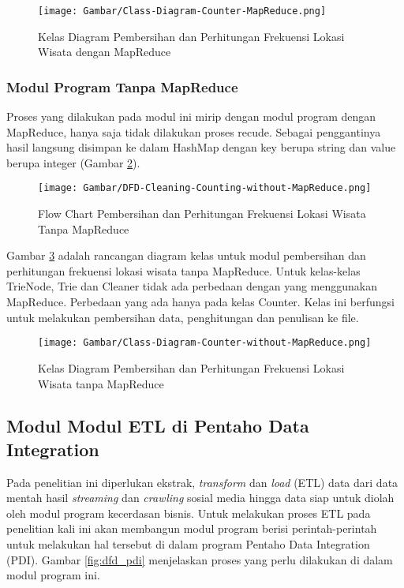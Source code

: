 \begin{figure}[H]
	\centering
	\texttt{[image: Gambar/Class-Diagram-Counter-MapReduce.png]}
	\caption[Kelas Diagram Pembersihan dan Perhitungan Frekuensi Lokasi Wisata dengan MapReduce]{Kelas Diagram Pembersihan dan Perhitungan Frekuensi Lokasi Wisata dengan MapReduce} 
	\label{fig:class_frekuensi_mapreduce}
\end{figure}

\subsubsection{Modul Program Tanpa MapReduce}
Proses yang dilakukan pada modul ini mirip dengan modul program dengan MapReduce, hanya saja tidak dilakukan proses recude. Sebagai penggantinya hasil langsung disimpan ke dalam HashMap dengan key berupa string dan value berupa integer (Gambar \ref{fig:flow_frekuensi_tanpa_mapreduce}).

\begin{figure}[H]
	\centering
	\texttt{[image: Gambar/DFD-Cleaning-Counting-without-MapReduce.png]}
	\caption[Flow Chart Pembersihan dan Perhitungan Frekuensi Lokasi Wisata Tanpa MapReduce]{Flow Chart Pembersihan dan Perhitungan Frekuensi Lokasi Wisata Tanpa MapReduce} 
	\label{fig:flow_frekuensi_tanpa_mapreduce}
\end{figure}

Gambar \ref{fig:class_frekuensi_tanpa_mapreduce} adalah rancangan diagram kelas untuk modul pembersihan dan perhitungan frekuensi lokasi wisata tanpa MapReduce. Untuk kelas-kelas TrieNode, Trie dan Cleaner tidak ada perbedaan dengan yang menggunakan MapReduce. Perbedaan yang ada hanya pada kelas Counter. Kelas ini berfungsi untuk melakukan pembersihan data, penghitungan dan penulisan ke file.

\begin{figure}[H]
	\centering
	\texttt{[image: Gambar/Class-Diagram-Counter-without-MapReduce.png]}
	\caption[Kelas Diagram Pembersihan dan Perhitungan Frekuensi Lokasi Wisata tanpa MapReduce]{Kelas Diagram Pembersihan dan Perhitungan Frekuensi Lokasi Wisata tanpa MapReduce} 
	\label{fig:class_frekuensi_tanpa_mapreduce}
\end{figure}

\subsection{Modul Modul ETL di Pentaho Data Integration}
Pada penelitian ini diperlukan ekstrak, \textit{transform} dan \textit{load} (ETL) data dari data mentah hasil \textit{streaming} dan \textit{crawling} sosial media hingga data siap untuk diolah oleh modul program kecerdasan bisnis. Untuk melakukan proses ETL pada penelitian kali ini akan membangun modul program berisi perintah-perintah untuk melakukan hal tersebut di dalam program Pentaho Data Integration (PDI). Gambar \ref{fig:dfd_pdi} menjelaskan proses yang perlu dilakukan di dalam modul program ini. 

